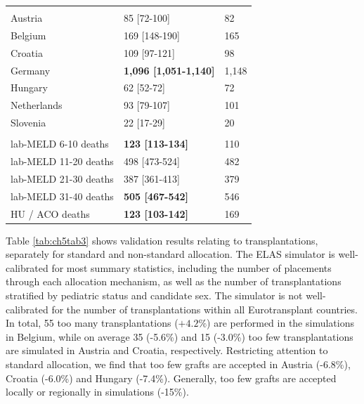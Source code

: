 \documentclass[11pt,twoside,]{book}
\begin{document}
\begin{table}[h]
{\begin{tabular}{L{5.4cm} R{4.2cm} L{2.6cm}}
    \addlinespace[0.3em]
    \\[.05cm]
    \hspace{1em}Austria & 85     [72-100] & 82 \\
    \hspace{1em}Belgium & 169    [148-190] & 165 \\
    \hspace{1em}Croatia & 109    [97-121] & 98 \\
    \hspace{1em}Germany & \textbf{1,096  [1,051-1,140]} & 1,148 \\
    \hspace{1em}Hungary & 62     [52-72] & 72 \\
    \hspace{1em}Netherlands & 93     [79-107] & 101 \\
    \hspace{1em}Slovenia & 22     [17-29] & 20 \\
    \addlinespace[0.3em]
    \\[.05cm]
    \hspace{1em}lab-MELD 6-10 deaths & \textbf{123    [113-134]} & 110 \\
    \hspace{1em}lab-MELD 11-20 deaths & 498    [473-524] & 482 \\
    \hspace{1em}lab-MELD 21-30 deaths & 387    [361-413] & 379 \\
    \hspace{1em}lab-MELD 31-40 deaths & \textbf{505 [467-542]} & 546 \\
    \hspace{1em}HU / ACO deaths & \textbf{123    [103-142]} & 169 \\
    \bottomrule
\end{tabular}
}
\end{table}

\FloatBarrier

Table \ref{tab:ch5tab3} shows validation results relating
to transplantations, separately for standard and non-standard
allocation. The ELAS simulator is well-calibrated for most
summary statistics, including the number of placements through each
allocation mechanism, as well as the number of transplantations
stratified by pediatric status and candidate sex.
The simulator is not well-calibrated for the number
of transplantations within all Eurotransplant countries.
In total, 55 too many
transplantations (\(+4.2\%\)) are performed in the simulations in Belgium, while
on average 35 (-5.6\%) and 15 (-3.0\%) too few transplantations are simulated in Austria
and Croatia, respectively. Restricting attention to standard allocation, we find that
too few grafts are accepted in Austria (-6.8\%), Croatia (-6.0\%) and Hungary (-7.4\%).
Generally, too few grafts are accepted locally or regionally in simulations (-15\%).
\end{document}
